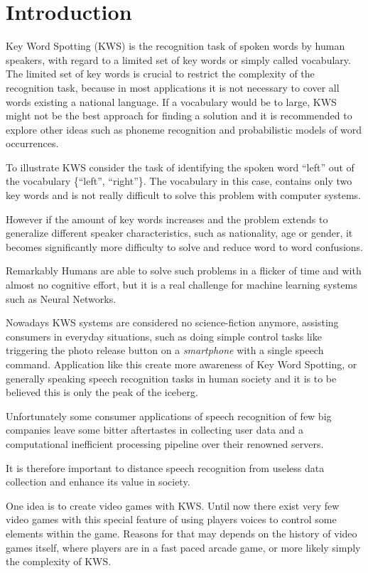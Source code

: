 
\chapter{Introduction}\label{sec:intro}
Key Word Spotting (KWS) is the recognition task of spoken words by human speakers, with regard to a limited set of key words or simply called vocabulary.
The limited set of key words is crucial to restrict the complexity of the recognition task, because in most applications it is not necessary to cover all words existing a national language.
If a vocabulary would be to large, KWS might not be the best approach for finding a solution and it is recommended to explore other ideas such as phoneme recognition and probabilistic models of word occurrences.

To illustrate KWS consider the task of identifying the spoken word \enquote{left} out of the vocabulary \{\enquote{left}, \enquote{right}\}.
The vocabulary in this case, contains only two key words and is not really difficult to solve this problem with computer systems.

However if the amount of key words increases and the problem extends to generalize different speaker characteristics, such as nationality, age or gender, it becomes significantly more difficulty to solve and reduce word to word confusions.

Remarkably Humans are able to solve such problems in a flicker of time and with almost no cognitive effort, but it is a real challenge for machine learning systems such as Neural Networks.

Nowadays KWS systems are considered no science-fiction anymore, assisting consumers in everyday situations, such as doing simple control tasks like triggering the photo release button on a \emph{smartphone} with a single speech command.
Application like this create more awareness of Key Word Spotting, or generally speaking speech recognition tasks in human society and it is to be believed this is only the peak of the iceberg.

Unfortunately some consumer applications of speech recognition of few big companies leave some bitter aftertastes in collecting user data and a computational inefficient processing pipeline over their renowned servers.

It is therefore important to distance speech recognition from useless data collection and enhance its value in society.

One idea is to create video games with KWS.
Until now there exist very few video games with this special feature of using players voices to control some elements within the game.
Reasons for that may depends on the history of video games itself, where players are in a fast paced arcade game, or more likely simply the complexity of KWS.

